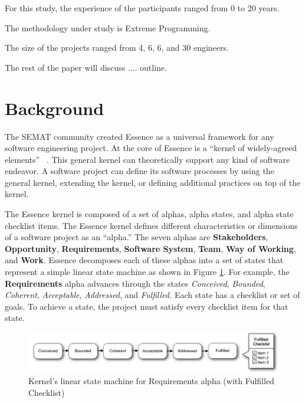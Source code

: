 \documentclass[preprint,12pt,3p]{elsarticle}
\begin{document}
For this study, the experience of the participants ranged from 0 to 20 years.

The methodology under study is Extreme Programming. \cite{ExtremeProgrammingExplained}

The size of the projects ranged from 4, 6, 6, and 30 engineers.

The rest of the paper will discuss .... outline.


\section{Background}
The SEMAT community created Essence as a universal framework for any software engineering project. At the core of Essence is a ``kernel of widely-agreed elements'' ~\cite{JacobsonQueue}. This general kernel can theoretically support any kind of software endeavor. A software project can define its software processes by using the general kernel, extending the kernel, or defining additional practices on top of the kernel.

The Essence kernel is composed of a set of alphas, alpha states, and alpha state checklist items. The Essence kernel defines different characteristics or dimensions of a software project as an ``alpha.'' The seven alphas are \textbf{Stakeholders}, \textbf{Opportunity}, \textbf{Requirements}, \textbf{Software System}, \textbf{Team}, \textbf{Way of Working}, and \textbf{Work}. Essence decomposes each of these alphas into a set of states that represent a simple linear state machine as shown in Figure \ref{StateMachine}. For example, the \textbf{Requirements} alpha advances through the states \textit{Conceived}, \textit{Bounded}, \textit{Coherent}, \textit{Acceptable}, \textit{Addressed}, and \textit{Fulfilled.} Each state has a checklist or set of goals. To achieve a state, the project must satisfy every checklist item for that state. \cite{OMGStandard} 
 
\begin{figure}[h]\vspace*{4pt}
\centerline{\includegraphics[width=5.4in]{kernel_images/StateMachineRequirements}}
\caption{Kernel's linear state machine for Requirements alpha (with Fulfilled Checklist)}\vspace*{-6pt}\label{StateMachine}
\end{figure}
\end{document}
